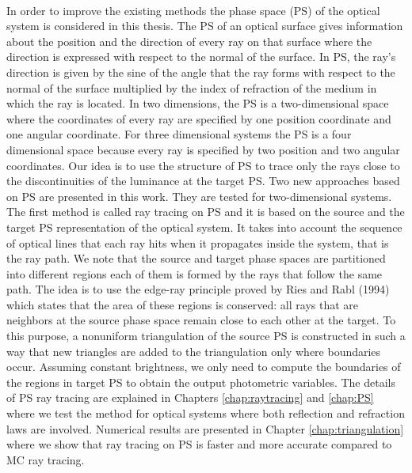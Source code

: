 \\ \indent
In order to improve the existing methods the phase space (PS) of the optical system is considered in this thesis. The PS of an optical surface gives information about the position and the direction of every ray on that surface where the direction is expressed with respect to the normal of the surface. In PS, the ray's direction is given by the sine of the angle that the ray forms with respect to the normal of the surface multiplied by the index of refraction of the medium in which the ray is located.
In two dimensions, the PS is a two-dimensional space where the coordinates of every ray are specified by one position coordinate and one angular coordinate. 
For three dimensional systems the PS is a four dimensional space because every ray is specified by two position and two angular coordinates. Our idea is to use the structure of PS to trace only the rays close to the discontinuities of the luminance at the target PS.
Two new approaches based on PS are presented in this work. They are tested for two-dimensional systems. 
\\ \indent The first method is called ray tracing on PS and it is based on the source and the target PS representation of the optical system. It takes into account the sequence of optical lines that each ray hits when it propagates inside the system, that is the ray path. We note that the source and target phase spaces are partitioned into different regions each of them is formed by the rays that follow the same path. The idea is to use the edge-ray principle proved by Ries and Rabl (1994) which states that the area of these regions is conserved: all rays that are neighbors at the source phase space remain close to each other at the target. To this purpose, a nonuniform triangulation of the source PS is constructed in such a way that new triangles are added to the triangulation only where boundaries occur. 
Assuming constant brightness, we only need to compute the boundaries of the regions in target PS to obtain the output photometric variables. 
The details of PS ray tracing are explained in Chapters \ref{chap:raytracing} and \ref{chap:PS} where we test the method for optical systems where both reflection and refraction laws are involved.
 Numerical results are presented in Chapter \ref{chap:triangulation} where we show that ray tracing on PS is faster and more accurate compared to MC ray tracing.
